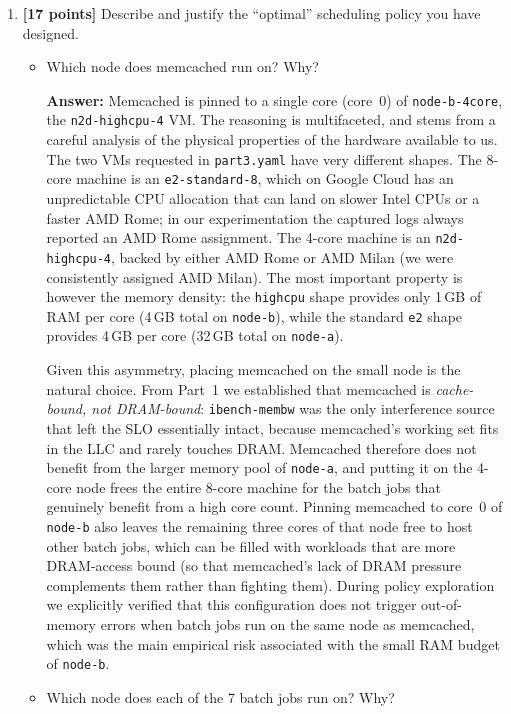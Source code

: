 \begin{enumerate}
\begin{enumerate}
    \item \textbf{[17 points]} Describe and justify the “optimal” scheduling policy you have designed. 
    
    \begin{itemize}
        \item Which node does memcached run on? Why?

        \textbf{Answer:}
        Memcached is pinned to a single core (core~0) of \texttt{node-b-4core}, the \texttt{n2d-highcpu-4} VM. The reasoning is multifaceted, and stems from a careful analysis of the physical properties of the hardware available to us. The two VMs requested in \texttt{part3.yaml} have very different shapes. The 8-core machine is an \texttt{e2-standard-8}, which on Google Cloud has an unpredictable CPU allocation that can land on slower Intel CPUs or a faster AMD Rome; in our experimentation the captured logs always reported an AMD Rome assignment. The 4-core machine is an \texttt{n2d-highcpu-4}, backed by either AMD Rome or AMD Milan (we were consistently assigned AMD Milan). The most important property is however the memory density: the \texttt{highcpu} shape provides only 1\,GB of RAM per core (4\,GB total on \texttt{node-b}), while the standard \texttt{e2} shape provides 4\,GB per core (32\,GB total on \texttt{node-a}).

        Given this asymmetry, placing memcached on the small node is the natural choice. From Part~1 we established that memcached is \emph{cache-bound, not DRAM-bound}: \texttt{ibench-membw} was the only interference source that left the SLO essentially intact, because memcached's working set fits in the LLC and rarely touches DRAM. Memcached therefore does not benefit from the larger memory pool of \texttt{node-a}, and putting it on the 4-core node frees the entire 8-core machine for the batch jobs that genuinely benefit from a high core count. Pinning memcached to core~0 of \texttt{node-b} also leaves the remaining three cores of that node free to host other batch jobs, which can be filled with workloads that are more DRAM-access bound (so that memcached's lack of DRAM pressure complements them rather than fighting them). During policy exploration we explicitly verified that this configuration does not trigger out-of-memory errors when batch jobs run on the same node as memcached, which was the main empirical risk associated with the small RAM budget of \texttt{node-b}.
        \\

        \item Which node does each of the 7 batch jobs run on? Why?


\end{itemize}
\end{enumerate}
\end{enumerate}
